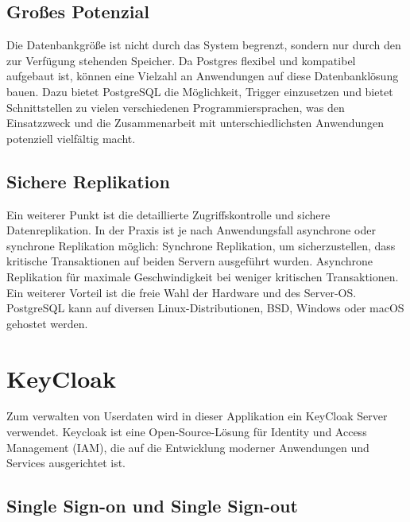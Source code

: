 \subsection{Großes Potenzial}

Die Datenbankgröße ist nicht durch das System begrenzt, sondern nur durch den zur Verfügung stehenden Speicher. Da Postgres flexibel und kompatibel aufgebaut ist, 
können eine Vielzahl an Anwendungen auf diese Datenbanklösung bauen. Dazu bietet PostgreSQL die Möglichkeit, 
Trigger einzusetzen und bietet Schnittstellen zu vielen verschiedenen Programmiersprachen, was den Einsatzzweck und die Zusammenarbeit mit unterschiedlichsten Anwendungen potenziell vielfältig macht.
\cite{sysarch-postgresql-1}

\subsection{Sichere Replikation}

Ein weiterer Punkt ist die detaillierte Zugriffskontrolle und sichere Datenreplikation. In der Praxis ist je nach Anwendungsfall asynchrone oder synchrone Replikation möglich: 
Synchrone Replikation, um sicherzustellen, dass kritische Transaktionen auf beiden Servern ausgeführt wurden. Asynchrone Replikation für maximale Geschwindigkeit bei weniger kritischen Transaktionen. 
Ein weiterer Vorteil ist die freie Wahl der Hardware und des Server-OS. PostgreSQL kann auf diversen Linux-Distributionen, BSD, Windows oder macOS 
gehostet werden.
\cite{sysarch-postgresql-1}

\section{KeyCloak}

Zum verwalten von Userdaten wird in dieser Applikation ein KeyCloak Server verwendet.
Keycloak ist eine Open-Source-Lösung für Identity und Access Management (IAM), die auf die Entwicklung moderner Anwendungen und Services ausgerichtet ist.
\cite{sysarch-keycloak-1}

\subsection{Single Sign-on und Single Sign-out}

